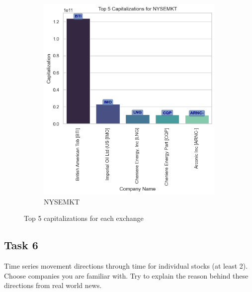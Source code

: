 \documentclass[12pt]{article}
\begin{document}
\begin{figure}[h!]
\begin{subfigure}{.7\textwidth}
        \includegraphics[width=.7\textwidth]{P1.5.5.png}
        \caption{NYSEMKT}
        \label{fig:1.5.5}
    \end{subfigure}
    \caption{Top 5 capitalizations for each exchange}
\end{figure}

\pagebreak

\subsection{Task 6}

\begin{qsolve}[Task]
    Time series movement directions through time for individual 
    stocks (at least 2). Choose companies you are familiar with. 
    Try to explain the reason behind these directions from real 
    world news.
\end{qsolve}
\end{document}
